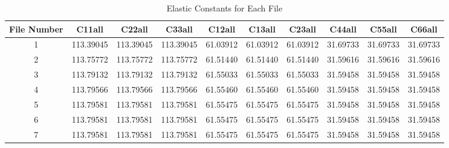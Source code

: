 \begin{table}[h!]
\centering
\begin{tabular}{|c|c|c|c|c|c|c|c|c|c|}
\hline
File Number & C11all & C22all & C33all & C12all & C13all & C23all & C44all & C55all & C66all \\
\hline
1 & 113.39045 & 113.39045 & 113.39045 & 61.03912 & 61.03912 & 61.03912 & 31.69733 & 31.69733 & 31.69733 \\
\hline
2 & 113.75772 & 113.75772 & 113.75772 & 61.51440 & 61.51440 & 61.51440 & 31.59616 & 31.59616 & 31.59616 \\
\hline
3 & 113.79132 & 113.79132 & 113.79132 & 61.55033 & 61.55033 & 61.55033 & 31.59458 & 31.59458 & 31.59458 \\
\hline
4 & 113.79566 & 113.79566 & 113.79566 & 61.55460 & 61.55460 & 61.55460 & 31.59458 & 31.59458 & 31.59458 \\
\hline
5 & 113.79581 & 113.79581 & 113.79581 & 61.55475 & 61.55475 & 61.55475 & 31.59458 & 31.59458 & 31.59458 \\
\hline
6 & 113.79581 & 113.79581 & 113.79581 & 61.55475 & 61.55475 & 61.55475 & 31.59458 & 31.59458 & 31.59458 \\
\hline
7 & 113.79581 & 113.79581 & 113.79581 & 61.55475 & 61.55475 & 61.55475 & 31.59458 & 31.59458 & 31.59458 \\
\hline
\end{tabular}
\caption{Elastic Constants for Each File}
\label{tab:elastic_constants}
\end{table}
